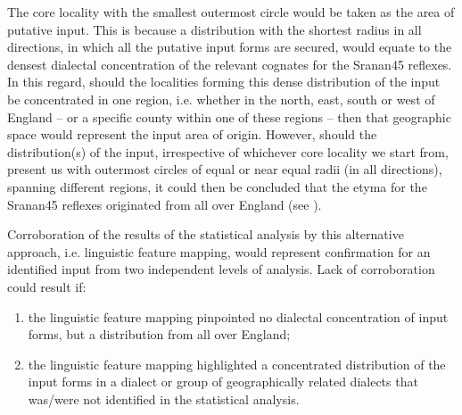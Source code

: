 {{{{{{{{{The core locality with the smallest outermost circle would be taken as the area of putative input. This is because a distribution with the shortest radius in all directions, in which all the putative input forms are secured, would equate to the densest dialectal concentration of the relevant cognates for the  Sranan45 reflexes. In this regard, should the localities forming this dense distribution of the input be concentrated in one region, i.e. whether in the north, east, south or west of England -- or a specific county within one of these regions -- then that geographic space would represent the input area of origin. However, should the distribution(s) of the input, irrespective of whichever core locality we start from, present us with outermost circles of equal or near equal radii (in all directions), spanning different regions, it could then be concluded that the etyma for the Sranan45 reflexes originated from all over England (see ).

Corroboration of the results of the statistical analysis by this alternative approach, i.e. linguistic feature mapping, would represent confirmation for an identified input from two independent levels of analysis. Lack of corroboration could result if:

\begin{enumerate}
\item {the linguistic feature mapping pinpointed no dialectal concentration of input forms, but a distribution from all over England;}
\item{the linguistic feature mapping highlighted a concentrated distribution of the input forms in a dialect or group of geographically related dialects that was/were not identified in the statistical analysis.}
\end{enumerate}

}}}}}}}}}
